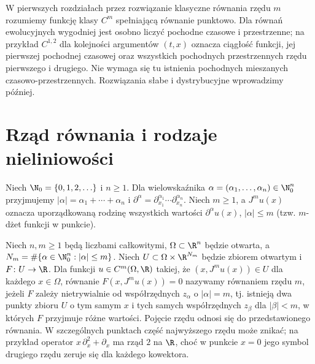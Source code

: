 W pierwszych rozdziałach przez rozwiązanie klasyczne równania rzędu
$m$ rozumiemy funkcję klasy $C^m$ spełniającą równanie punktowo. Dla równań
ewolucyjnych wygodniej jest osobno liczyć pochodne czasowe i
przestrzenne; na przykład $C^{1,2}$ dla kolejności argumentów $(t,x)$ oznacza ciągłość funkcji, jej pierwszej pochodnej czasowej
oraz wszystkich pochodnych przestrzennych rzędu pierwszego i drugiego.
Nie wymaga się tu istnienia pochodnych mieszanych czasowo-przestrzennych. Rozwiązania słabe i dystrybucyjne
wprowadzimy później.

\section{Rząd równania i rodzaje nieliniowości}
\label{sec:pde-types}

Niech $\N_0=\{0,1,2,\ldots\}$ i $n\geq1$.
Dla wielowskaźnika $\alpha=(\alpha_1,\ldots,\alpha_n)\in\N_0^n$
przyjmujemy $|\alpha|=\alpha_1+\cdots+\alpha_n$ i
$\partial^\alpha=\partial_{x_1}^{\alpha_1}\cdots
\partial_{x_n}^{\alpha_n}$. Niech $m\geq1$, a $J^m u(x)$ oznacza
uporządkowaną rodzinę wszystkich wartości $\partial^\alpha u(x)$,
$|\alpha|\leq m$ (tzw. $m$-dżet funkcji w punkcie).

\begin{definicja}
Niech $n,m\geq1$ będą liczbami całkowitymi,
$\Omega\subset\R^n$ będzie otwarta, a
$N_m=\#\{\alpha\in\N_0^n:|\alpha|\leq m\}$.
Niech $U\subset\Omega\times\R^{N_m}$ będzie zbiorem otwartym
i $F\colon U\to\R$. Dla funkcji $u\in C^m(\Omega,\R)$
takiej, że $(x,J^m u(x))\in U$ dla każdego $x\in\Omega$,
równanie $F(x,J^m u(x))=0$ nazywamy równaniem rzędu $m$,
jeżeli $F$ zależy nietrywialnie od współrzędnych $z_\alpha$
o $|\alpha|=m$, tj. istnieją dwa punkty zbioru $U$ o tym samym
$x$ i tych samych współrzędnych $z_\beta$ dla $|\beta|<m$,
w których $F$ przyjmuje różne wartości. Pojęcie rzędu odnosi się do przedstawionego równania.
W szczególnych punktach część najwyższego rzędu może znikać;
na przykład operator $x\,\partial_x^2+\partial_x$ ma rząd $2$
na $\R$, choć w punkcie $x=0$ jego symbol drugiego rzędu
zeruje się dla każdego kowektora.
\end{definicja}

